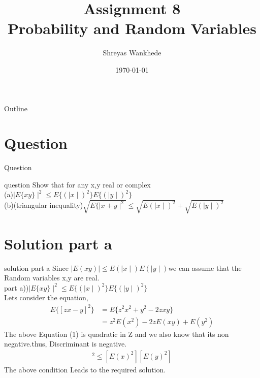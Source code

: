 \documentclass{beamer}
\title{Assignment 8\\Probability and Random Variables}
\author{Shreyas Wankhede}
\date{\today}
\institute{IIT Hyderabad}
\begin{document}
\begin{frame}
    \titlepage 
\end{frame}

\logo{}


\begin{frame}{Outline}
    \tableofcontents
\end{frame}


\section{Question}
\begin{frame}{Question}
\begin{block}{question}
 Show that for any x,y real or complex\\(a)$\mid E\{xy\}\mid^{2}\le E\{(\mid x \mid)^{2}\} E\{(\mid y \mid)^2\}$\\(b)(triangular inequality)$\sqrt{E\{\mid x+y\mid^2}\le \sqrt{E(\mid x \mid)^2} + \sqrt{E(\mid y \mid)^2}$
 
\end{block}
 

\end{frame}


\section{Solution part a}
\begin{frame}{solution part a}
    Since $\mid E(xy)\mid \le E(\mid x \mid) E(\mid y \mid)$we can assume that the Random variables x,y are real.\\
    part a))$\mid E\{xy\}\mid^{2}\le E\{(\mid x \mid)^{2}\} E\{(\mid y \mid)^2\}$\\
    Lets consider the equation,
    \begin{align}
    E\{[zx - y]^2\}&=E\{z^2x^2 +y^2 - 2zxy\}\nonumber\\
    &=z^2E(x^2) -2zE(xy)+ E(y^2)
    \end{align}
    The above Equation (1) is quadratic in Z and we also know that its non negative.thus, Discriminant is negative.
    \begin{align}
    [E(xy)]^2 \le [E(x)^2][E(y)^2] \nonumber
    \end{align}
   The above condition Leads to the required solution.
\end{frame} 
\end{document}
